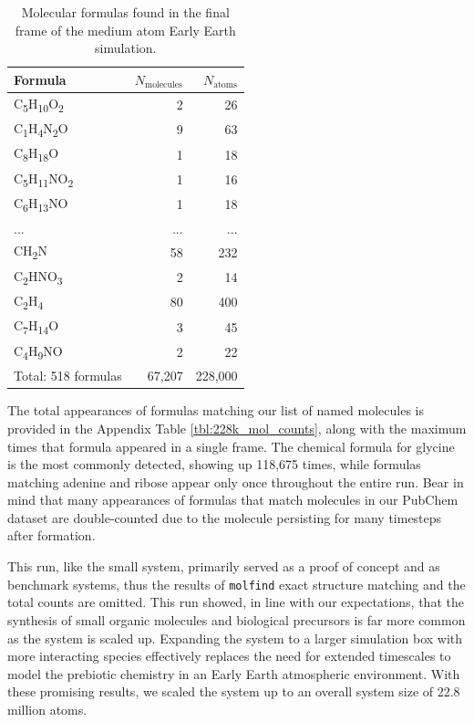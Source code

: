 \begin{table}[h!]
\centering
\caption[Chemical formulas in the final frame of the 228,000 atom run]{Molecular formulas found in the final frame of the medium atom Early Earth simulation.
}\label{tbl:228k_final_counts}
\begin{tabularx}{0.455\textwidth}{lrr}  
\toprule
Formula & $N_\text{molecules}$ & $N_\text{atoms}$ \\
\midrule
C\textsubscript{5}H\textsubscript{10}O\textsubscript{2} & 2 & 26 \\
C\textsubscript{1}H\textsubscript{4}N\textsubscript{2}O & 9 & 63 \\
C\textsubscript{8}H\textsubscript{18}O & 1 & 18 \\
C\textsubscript{5}H\textsubscript{11}NO\textsubscript{2} & 1 & 16 \\
C\textsubscript{6}H\textsubscript{13}NO & 1 & 18 \\
... & ... & ... \\
CH\textsubscript{2}N & 58 & 232 \\
C\textsubscript{2}HNO\textsubscript{3} & 2 & 14 \\
C\textsubscript{2}H\textsubscript{4} & 80 & 400 \\
C\textsubscript{7}H\textsubscript{14}O & 3 & 45 \\
C\textsubscript{4}H\textsubscript{9}NO & 2 & 22 \\
Total: 518 formulas & 67,207 & 228,000 \\
\bottomrule
\end{tabularx}
\end{table}

The total appearances of formulas matching our list of named molecules is provided in the Appendix Table \ref{tbl:228k_mol_counts}, along with the maximum times that formula appeared in a single frame.
The chemical formula for glycine is the most commonly detected, showing up 118,675 times, while formulas matching adenine and ribose appear only once throughout the entire run.
Bear in mind that many appearances of formulas that match molecules in our PubChem dataset are double-counted due to the molecule persisting for many timesteps after formation.

This run, like the small system, primarily served as a proof of concept and as benchmark systems, thus the results of \verb|molfind| exact structure matching and the total counts are omitted.
This run showed, in line with our expectations, that the synthesis of small organic molecules and biological precursors is far more common as the system is scaled up.
Expanding the system to a larger simulation box with more interacting species effectively replaces the need for extended timescales to model the prebiotic chemistry in an Early Earth atmospheric environment.
With these promising results, we scaled the system up to an overall system size of 22.8 million atoms.



